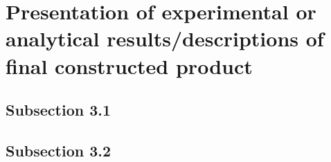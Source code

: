 \section{Presentation of experimental or analytical results/descriptions of final constructed product}
\subsection{Subsection 3.1}

\subsection{Subsection 3.2}
